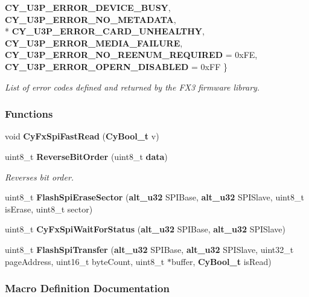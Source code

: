 \begin{DoxyCompactItemize}
{\bf C\+Y\+\_\+\+U3\+P\+\_\+\+E\+R\+R\+O\+R\+\_\+\+D\+E\+V\+I\+C\+E\+\_\+\+B\+U\+SY}, 
{\bf C\+Y\+\_\+\+U3\+P\+\_\+\+E\+R\+R\+O\+R\+\_\+\+N\+O\+\_\+\+M\+E\+T\+A\+D\+A\+TA}, 
\\*
{\bf C\+Y\+\_\+\+U3\+P\+\_\+\+E\+R\+R\+O\+R\+\_\+\+C\+A\+R\+D\+\_\+\+U\+N\+H\+E\+A\+L\+T\+HY}, 
{\bf C\+Y\+\_\+\+U3\+P\+\_\+\+E\+R\+R\+O\+R\+\_\+\+M\+E\+D\+I\+A\+\_\+\+F\+A\+I\+L\+U\+RE}, 
{\bf C\+Y\+\_\+\+U3\+P\+\_\+\+E\+R\+R\+O\+R\+\_\+\+N\+O\+\_\+\+R\+E\+E\+N\+U\+M\+\_\+\+R\+E\+Q\+U\+I\+R\+ED} = 0x\+FE, 
{\bf C\+Y\+\_\+\+U3\+P\+\_\+\+E\+R\+R\+O\+R\+\_\+\+O\+P\+E\+R\+N\+\_\+\+D\+I\+S\+A\+B\+L\+ED} = 0x\+FF
 \}\begin{DoxyCompactList}\small\item\em List of error codes defined and returned by the F\+X3 firmware library. \end{DoxyCompactList}
\end{DoxyCompactItemize}
\subsubsection*{Functions}
\begin{DoxyCompactItemize}
\item 
void {\bf Cy\+Fx\+Spi\+Fast\+Read} ({\bf Cy\+Bool\+\_\+t} v)
\item 
uint8\+\_\+t {\bf Reverse\+Bit\+Order} (uint8\+\_\+t {\bf data})
\begin{DoxyCompactList}\small\item\em Reverses bit order. \end{DoxyCompactList}\item 
uint8\+\_\+t {\bf Flash\+Spi\+Erase\+Sector} ({\bf alt\+\_\+u32} S\+P\+I\+Base, {\bf alt\+\_\+u32} S\+P\+I\+Slave, uint8\+\_\+t is\+Erase, uint8\+\_\+t sector)
\item 
uint8\+\_\+t {\bf Cy\+Fx\+Spi\+Wait\+For\+Status} ({\bf alt\+\_\+u32} S\+P\+I\+Base, {\bf alt\+\_\+u32} S\+P\+I\+Slave)
\item 
uint8\+\_\+t {\bf Flash\+Spi\+Transfer} ({\bf alt\+\_\+u32} S\+P\+I\+Base, {\bf alt\+\_\+u32} S\+P\+I\+Slave, uint32\+\_\+t page\+Address, uint16\+\_\+t byte\+Count, uint8\+\_\+t $\ast$buffer, {\bf Cy\+Bool\+\_\+t} is\+Read)
\end{DoxyCompactItemize}


\subsubsection{Macro Definition Documentation}
